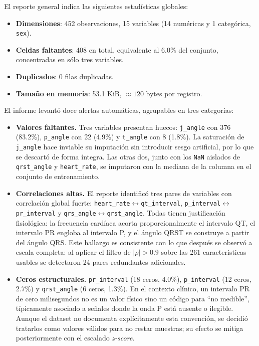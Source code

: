 El reporte general indica las siguientes estadísticas globales:

\begin{itemize}
    \item \textbf{Dimensiones}: 452 observaciones, 15 variables (14 numéricas
          y 1 categórica, \texttt{sex}).
    \item \textbf{Celdas faltantes}: 408 en total, equivalente al $6.0\%$
          del conjunto, concentradas en sólo tres variables.
    \item \textbf{Duplicados}: 0 filas duplicadas.
    \item \textbf{Tamaño en memoria}: 53.1 KiB, $\approx 120$ bytes por
          registro.
\end{itemize}

El informe levantó doce alertas automáticas, agrupables en tres categorías:

\begin{itemize}
    \item \textbf{Valores faltantes.} Tres variables presentan huecos:
          \texttt{j\_angle} con 376 (83.2\%), \texttt{p\_angle} con 22
          (4.9\%) y \texttt{t\_angle} con 8 (1.8\%). La saturación de
          \texttt{j\_angle} hace inviable su imputación sin introducir
          sesgo artificial, por lo que se descartó de forma íntegra. Las
          otras dos, junto con los \texttt{NaN} aislados de
          \texttt{qrst\_angle} y \texttt{heart\_rate}, se imputaron con la
          mediana de la columna en el conjunto de entrenamiento.

    \item \textbf{Correlaciones altas.} El reporte identificó tres pares de
          variables con correlación global fuerte:
          \texttt{heart\_rate}$\leftrightarrow$\texttt{qt\_interval},
          \texttt{p\_interval}$\leftrightarrow$\texttt{pr\_interval} y
          \texttt{qrs\_angle}$\leftrightarrow$\texttt{qrst\_angle}. Todas
          tienen justificación fisiológica: la frecuencia cardíaca acorta
          proporcionalmente el intervalo QT, el intervalo PR engloba al
          intervalo P, y el ángulo QRST se construye a partir del ángulo
          QRS. Este hallazgo es consistente con lo que después se observó
          a escala completa: al aplicar el filtro de $|\rho| > 0.9$ sobre
          las 261 características usables se detectaron 24 pares
          redundantes adicionales.

    \item \textbf{Ceros estructurales.} \texttt{pr\_interval}
          (18 ceros, 4.0\%), \texttt{p\_interval} (12 ceros, 2.7\%) y
          \texttt{qrst\_angle} (6 ceros, 1.3\%). En el contexto clínico,
          un intervalo PR de cero milisegundos no es un valor físico sino
          un código para ``no medible'', típicamente asociado a señales
          donde la onda P está ausente o ilegible. Aunque el dataset no
          documenta explícitamente esta convención, se decidió tratarlos
          como valores válidos para no restar muestras; su efecto se
          mitiga posteriormente con el escalado \textit{z-score}.
\end{itemize}

